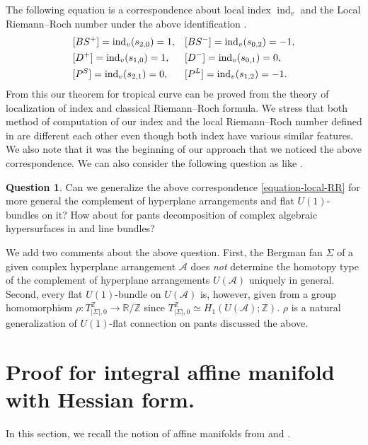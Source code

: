 \documentclass[a4paper,dvipdfmx,reqno,12pt]{amsart}
\theoremstyle{definition}
\newtheorem{question}[theorem]{Question}
\newcommand{\opn}[1]{\operatorname{#1}}
\numberwithin{equation}{section}
\begin{document}
The following equation is a correspondence about 
local index $\opn{ind}_v$ and the Local 
Riemann--Roch number under the above 
identification \cite[Theorem 6.7]{MR2676658}.
\begin{align} \label{equation-local-RR}
& [BS^{+}]=\opn{ind}_v(s_{2,0})=1, 
&& [BS^{-}]=\opn{ind}_v(s_{0,2})=-1,\notag \\
& [D^{+}]=\opn{ind}_v(s_{1,0})=1,
&& [D^{-}]=\opn{ind}_v(s_{0,1})=0, \\
& [P^{S}]=\opn{ind}_v(s_{2,1})=0,
&& [P^{L}]=\opn{ind}_v(s_{1,2})=-1 \notag.
\end{align}
From this our theorem for tropical curve can be 
proved from the theory of localization of index 
and classical Riemann--Roch formula.
We stress that both method of computation
of our index and the local Riemann--Roch number
defined in \cite{MR2676658} are different 
each other even though both index have various 
similar features.
We also note that it was the beginning of our 
approach that we 
noticed the above correspondence.
We can also consider the following question as 
like \cite{auroux2022lagrangian}.

\begin{question}
Can we generalize the 
above correspondence \ref{equation-local-RR}
for more general the complement of
hyperplane arrangements and flat $U(1)$-bundles on it?
How about for pants decomposition of
  complex algebraic hypersurfaces in \cite{MR2079993} and line bundles?
\end{question}

We add two comments about the above question. 
First, the Bergman fan $\Sigma$ of a given complex 
hyperplane arrangement $\mathcal{A}$ does \emph{not} 
determine 
the homotopy type of the complement of hyperplane
arrangements $U(\mathcal{A})$ uniquely in general.
Second, every flat $U(1)$-bundle on 
$U(\mathcal{A})$ is, 
however, given
from a group homomorphism 
$\rho\colon T_{|\Sigma|,0}^{\mathbb{Z}}\to 
\mathbb{R}/\mathbb{Z}$ since 
$T_{|\Sigma|,0}^{\mathbb{Z}}\simeq 
H_1(U(\mathcal{A});\mathbb{Z})$.
$\rho$ is a natural generalization of $U(1)$-flat 
connection on pants discussed the above.

\section{Proof for integral affine manifold with Hessian form.}
\label{section-integral-affine-manifold}
In this section,
we recall the notion of affine manifolds from
\cite{MR2293045,
goldmanRadianceObstructionParallel1984a,
MR2181810,
grossMirrorSymmetryLogarithmic2006a} and 
\cite[Chapter 6]{MR2567952}.
\end{document}
